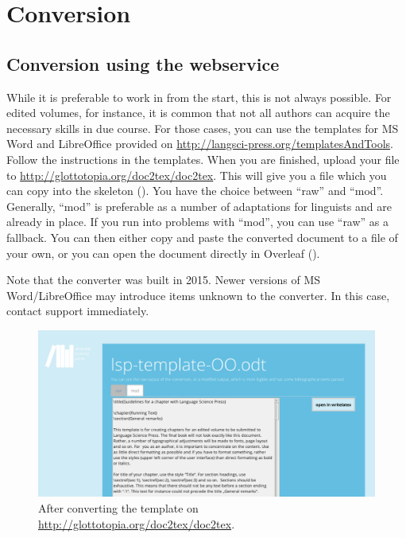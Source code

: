 \chapter{Conversion} 
\section{Conversion using the webservice}
While it is preferable to work in \latex from the start, this is not always possible. For edited volumes, for instance, it is common that not all authors can acquire the necessary skills in due course. For those cases, you can use the templates for MS Word and LibreOffice provided on \url{http://langsci-press.org/templatesAndTools}. Follow the instructions in the templates. When you are finished, upload your file to \url{http://glottotopia.org/doc2tex/doc2tex}. This will give you a file which you can copy into the skeleton (). You have the choice between ``raw'' and ``mod''. Generally,  ``mod'' is preferable as a number of adaptations for linguists and \lsp are already in place. If you run into problems with ``mod'', you can use  ``raw'' as a fallback. You can then either copy and paste the converted document to a file of your own, or you can open the document directly in Overleaf ().

Note that the converter was built in 2015. Newer versions of MS Word/LibreOffice may introduce items unknown to the converter. In this case, contact support immediately.

\begin{figure}
\includegraphics[width=\textwidth]{converter.png} 
\caption{After converting the template on \url{http://glottotopia.org/doc2tex/doc2tex}.}
\label{fig:conversion:glottotopia}
\end{figure}

